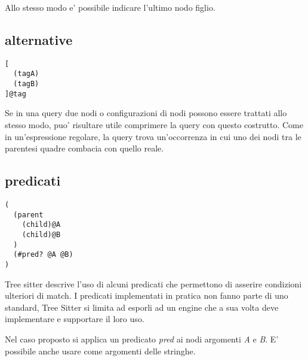 Allo stesso modo e' possibile indicare l'ultimo nodo figlio.

\subsection{alternative}

\begin{Verbatim}[samepage=true]
[
  (tagA)
  (tagB)
]@tag
\end{Verbatim}

Se in una query due nodi o configurazioni di nodi possono essere trattati allo stesso modo, puo' risultare utile comprimere la query con questo costrutto.
Come in un'espressione regolare, la query trova un'occorrenza in cui uno dei nodi tra le parentesi quadre combacia con quello reale.


\subsection{predicati}

\begin{Verbatim}[samepage=true]
(
  (parent
    (child)@A
    (child)@B
  )
  (#pred? @A @B)
)
\end{Verbatim}

Tree sitter descrive l'uso di alcuni predicati che permettono di asserire condizioni ulteriori di match.
I predicati implementati in pratica non fanno parte di uno standard, Tree Sitter si limita ad esporli ad un engine che a sua volta deve implementare e supportare il loro uso.

Nel caso proposto si applica un predicato \emph{pred} ai nodi argomenti \emph{A} e \emph{B}.
E' possibile anche usare come argomenti delle stringhe.
